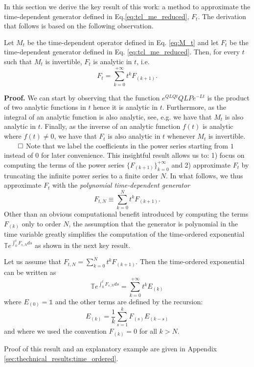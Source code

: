 \documentclass[twocolumn]{autart}    %
\newenvironment{proof}{\textbf{Proof.}}{\hfill $\qed$}
\newcommand{\Tb}{\mathbb{T}}
\newcommand{\one}{\mathbb{1}}
\begin{document}
In this section we derive the key result of this work: a method to approximate the time-dependent generator defined in Eq.\eqref{eq:tcl_me_reduced}, $F_t$. The derivation that follows is based on the following observation. 
\begin{prop}
    Let $M_t$ be the time-dependent operator defined in Eq. \eqref{eq:M_t} and let $F_t$ be the time-dependent generator defined in Eq. \eqref{eq:tcl_me_reduced}. Then, for every $t$ such that $M_t$ is invertible, $F_t$ is analytic in $t$, i.e. 
    \[F_t = \sum_{k=0}^{+\infty} t^k F_{(k+1)}.\]
\end{prop}
\begin{proof}
    We can start by observing that the function $e^{QLQt}QLPe^{-Lt}$ is the product of two analytic functions in $t$ hence it is analytic in $t$. Furthermore, as the integral of an analytic function is also analytic, see, e.g. \cite{bourchtein2021analytic} we have that $M_t$  is also analytic in $t$. Finally, as the inverse of an analytic function $f(t)$ is analytic where $f(t)\neq0$, we have that $F_t$ is also analytic in $t$ whenever $M_t$ is invertible. 
\end{proof}
Note that we label the coefficients in the power series starting from $1$ instead of $0$ for later convenience. This insightful result allows us to: 1) focus on computing the terms of the power series $\{F_{(k+1)}\}_{k=0}^{+\infty}$ and 2) approximate $F_t$ by truncating the infinite power series to a finite order $N$. In what follows, we thus approximate $F_t$ with the {\em polynomial time-dependent generator} 
\[F_{t,N} \equiv \sum_{k=0}^N t^k F_{(k+1)}.\]
Other than an obvious computational benefit introduced by computing the terms $F_{(k)}$ only to order $N$, the assumption that the generator is polynomial in the time variable greatly simplifies the computation of the time-ordered exponential $\Tb e^{\int_0^t F_{s,N} ds}$ as shown in the next key result. 

\begin{thm}
\label{thm:time_ordered_expansion}
    Let us assume that \(F_{t,N} = \sum_{k=0}^{N} t^k F_{(k+1)}\). 
    Then the time-ordered exponential can be written as
    \begin{equation}
        \Tb e^{\int_0^t F_{s,N} ds} = \sum_{k=0}^{+\infty} t^k E_{(k)}
        \label{eqn:time_ordered_expansion}
    \end{equation}
    where $E_{(0)}=\one$ and the other terms are defined by the recursion:
    \begin{equation}
        E_{(k)} =  \frac{1}{k} \sum_{s=1}^{k} F_{(s)}E_{(k-s)}
        \label{eqn:E_k}
    \end{equation}
    and where we used the convention $F_{(k)}=0$ for all $k>N$.
\end{thm}
Proof of this result and an explanatory example are given in Appendix \ref{sec:thechnical_results:time_ordered}.
\end{document}
